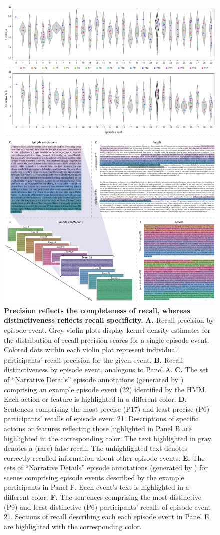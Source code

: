 \documentclass[10pt]{article}
\begin{document}
\begin{figure}[tp]
  \centering
  \vspace*{-1cm}
  \includegraphics[width=.7\textwidth]{figs/precision_distinctiveness_detail}
  \caption{\small \textbf{Precision reflects the completeness of recall, whereas distinctiveness reflects recall specificity.} \textbf{A.} Recall precision by episode event.  Grey violin plots display kernel density estimates for the distribution of recall precision scores for a single episode event.  Colored dots within each violin plot represent individual participants' recall precision for the given event.  \textbf{B.} Recall distinctiveness by episode event, analogous to Panel A.  \textbf{C.} The set of ``Narrative Details'' episode annotations (generated by \citealp{ChenEtal17}) comprising an example episode event (22) identified by the HMM.  Each action or feature is highlighted in a different color.  \textbf{D.} Sentences comprising the most precise (P17) and least precise (P6) participants' recalls of episode event 21.  Descriptions of specific actions or features reflecting those highlighted in Panel B are highlighted in the corresponding color.  The text highlighted in gray denotes a (rare) false recall.  The unhighlighted text denotes correctly recalled information about other episode events.  \textbf{E.} The sets of ``Narrative Details'' episode annotations (generated by \citealp{ChenEtal17}) for scenes comprising episode events described by the example participants in Panel F.  Each event's text is highlighted in a different color.  \textbf{F.} The sentences comprising the most distinctive (P9) and least distinctive (P6) participants' recalls of episode event 21.  Sections of recall describing each each episode event in Panel E are highlighted with the corresponding color.}
  \label{fig:precision-detail}
\end{figure}
\end{document}
